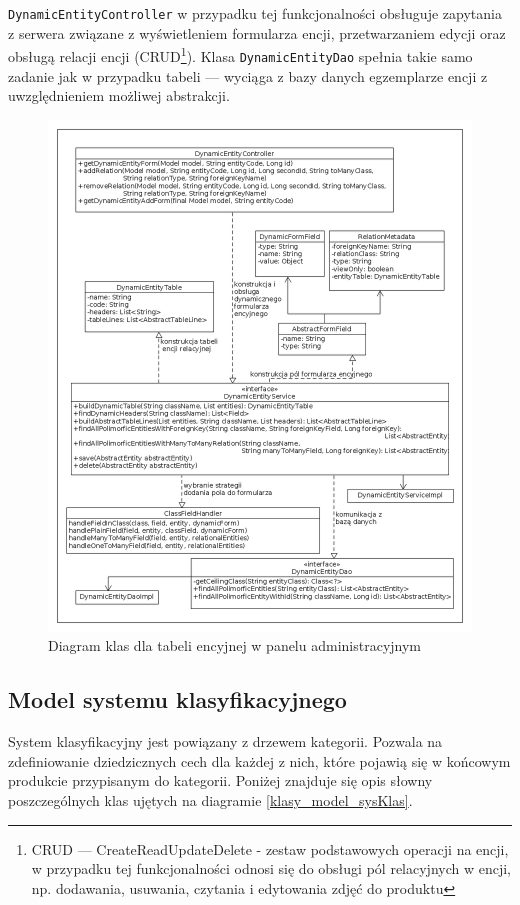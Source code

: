 \texttt{DynamicEntityController} w przypadku tej funkcjonalności obsługuje zapytania z serwera związane z wyświetleniem formularza encji, przetwarzaniem edycji oraz obsługą relacji encji (CRUD\footnote{CRUD — CreateReadUpdateDelete - zestaw podstawowych operacji na encji, w przypadku tej funkcjonalności odnosi się do obsługi pól relacyjnych w encji, np. dodawania, usuwania, czytania i edytowania zdjęć do produktu }). Klasa \texttt{DynamicEntityDao} spełnia takie samo zadanie jak w przypadku tabeli — wyciąga z bazy danych egzemplarze encji z uwzględnieniem możliwej abstrakcji.
\begin{figure}
	\begin{center}
		\includegraphics[scale=0.4]{klasy_formularz_encyjny.png}
	\end{center}
	\caption{{\color{black}Diagram klas dla tabeli encyjnej w panelu administracyjnym}} \label{klasy_formularz_encyjny}
\end{figure}

\subsection{Model systemu klasyfikacyjnego}
System klasyfikacyjny jest powiązany z drzewem kategorii. Pozwala na zdefiniowanie dziedzicznych cech dla każdej z nich, które pojawią się w końcowym produkcie przypisanym do kategorii. Poniżej znajduje się opis słowny poszczególnych klas ujętych na diagramie \ref{klasy_model_sysKlas}.

